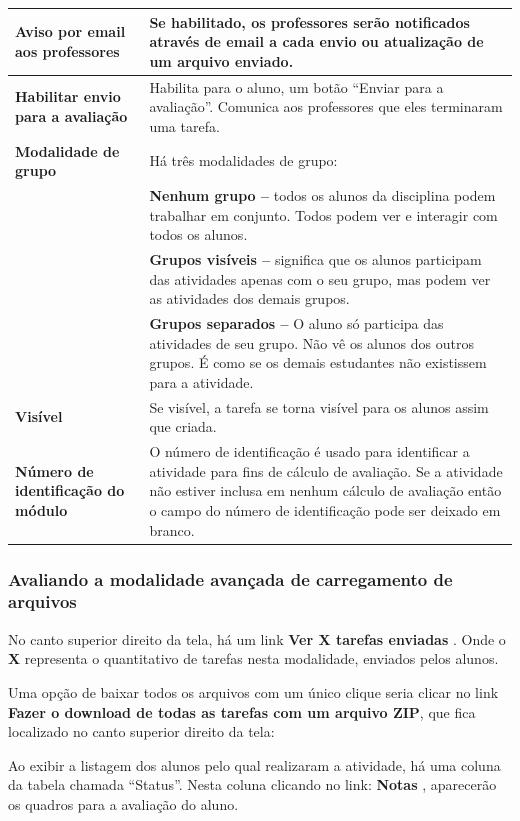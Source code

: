 \begin{longtable}{p{6cm}|p{9cm}}
    \textbf{Aviso por email aos professores} & Se habilitado, os professores serão notificados através de email a cada envio ou atualização de um arquivo enviado. \\\hline
    \textbf{Habilitar envio para a avaliação} & Habilita para o aluno, um botão “Enviar para a avaliação”. Comunica aos professores que eles terminaram uma tarefa. \\\hline
    \textbf{Modalidade de grupo} & Há três modalidades de grupo:\\
&\textbf{Nenhum grupo –} todos os alunos da disciplina podem trabalhar em conjunto. Todos podem ver e interagir com todos os  alunos. \\
&\textbf{Grupos visíveis –} significa que os alunos participam das atividades apenas com o seu grupo, mas podem ver as atividades dos demais grupos.\\
&\textbf{Grupos separados – }O aluno só participa das atividades de seu grupo. Não vê os alunos dos outros grupos. É como se os demais estudantes não existissem para a atividade.
 \\\hline
    \textbf{Visível} & Se visível, a tarefa se torna visível para os alunos assim que criada.\\\hline
    \textbf{Número de identificação do módulo} & O número de identificação é usado para identificar a atividade para fins de cálculo de avaliação. Se a atividade não estiver inclusa em nenhum cálculo de avaliação então o campo do número de identificação pode ser deixado em branco.\\\hline
\end{longtable}%

\subsubsection{Avaliando a modalidade avançada de carregamento de arquivos}

No canto superior direito da tela, há um link \textbf{Ver X tarefas enviadas} .  Onde o \textbf{X}  representa o quantitativo de tarefas nesta modalidade, enviados pelos alunos.

Uma opção de baixar todos os arquivos com um único clique seria clicar no link \textbf{Fazer o download de todas as tarefas com um arquivo ZIP}, que fica localizado no canto superior direito da tela:

Ao exibir a listagem dos alunos pelo qual realizaram a atividade, há uma coluna da tabela chamada “Status”.
Nesta coluna clicando no link: \textbf{Notas} , aparecerão os quadros para a avaliação do aluno.

